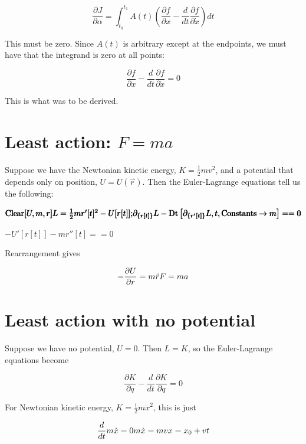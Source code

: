 \documentclass{article}
\begin{document}
\[\frac{\partial J}{\partial \alpha }=\int _{t_0}^{t_1}A(t)\left(\frac{\partial f}{\partial x} -\frac{d}{dt}\frac{\partial f}{\partial \dot{x}}\right)dt\]

This must be zero. { }Since \(A(t)\) is arbitrary except at the endpoints, we must have that the integrand is zero at all points:

\[\frac{\partial f}{\partial x} -\frac{d}{dt}\frac{\partial f}{\partial \dot{x}}=0\]

This is what was to be derived.

\section*{Least action: \(F=m a\)}

Suppose we have the Newtonian kinetic energy, \(K =\frac{1}{2}m v^2\), and a potential that depends only on position, \(U=U\left(\overset{\rightharpoonup
}{r}\right)\). { }Then the Euler-Lagrange equations tell us the following:

\begin{doublespace}
\noindent\(\pmb{\text{Clear}[U,m,r]}\\
\pmb{L=\frac{1}{2} m r'[t]^2-U[r[t]];}\\
\pmb{\partial _{\{r[t]\}}L-\text{Dt}\left[\partial _{\left\{r'[t]\right\}}L,t,\text{Constants}\to m\right]==0}\)
\end{doublespace}

\begin{doublespace}
\noindent\(-U'[r[t]]-m r''[t]==0\)
\end{doublespace}

Rearrangement gives

\[-\frac{\partial U}{\partial r}=m \ddot{r} \\
\\
F=m a\]

\section*{Least action with no potential}

Suppose we have no potential, \(U=0\). { }Then \(L=K\), so the Euler-Lagrange equations become

\[\frac{\partial K}{\partial q}-\frac{d}{dt}\frac{\partial K}{\partial \dot{q}}=0\]

For Newtonian kinetic energy, \(K =\frac{1}{2}m \dot{x}^2\), this is just

\[\frac{d}{dt}m \dot{x}=0\\
\\
m \dot{x}=m v\\
\\
x=x_0+v t\]
\end{document}
